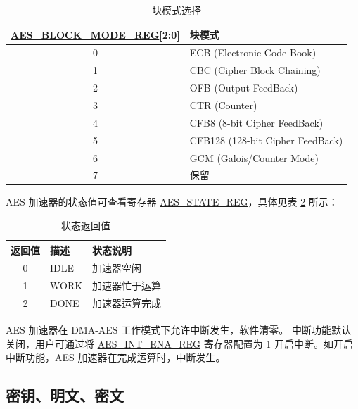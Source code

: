 \documentclass[main\_\_CN.tex]{subfiles}
\begin{document}
\begin{longtable}[c]{ | c | l | }
\caption{块模式选择}
\label{tab:aes-block-mode}
\\\hline
\rowcolor{lightgray}
\textbf{\hyperref[regdesc:AESBLOCKMODEREG]{AES\_BLOCK\_MODE\_REG}[2:0]}     & \textbf{块模式}\\
    \hline
    0                          & ECB (Electronic Code Book)    \\
    \hline
    1                          & CBC (Cipher Block Chaining)     \\
    \hline
    2                          & OFB (Output FeedBack)    \\
    \hline
    3                          & CTR (Counter)    \\
    \hline
    4                          & CFB8 (8-bit Cipher FeedBack)    \\
    \hline
    5                          & CFB128 (128-bit Cipher FeedBack) \\
    \hline
    6                          & GCM (Galois/Counter Mode)     \\
    \hline
    7                          & 保留     \\
    \hline
\end{longtable}

\clearpage
AES 加速器的状态值可查看寄存器 \hyperref[regdesc:AESSTATEREG]{AES\_STATE\_REG}，具体见表 \ref{tab:aes-state-value-dma} 所示：

\begin{longtable}[c]{ | c | l | l | }
\caption{状态返回值}
\label{tab:aes-state-value-dma}
\\\hline
\rowcolor{lightgray}
\textbf{返回值} & \textbf{描述} &  \textbf{状态说明} \\ \hline

    0                   & IDLE      &   加速器空闲\\ \hline
    1                   & WORK      &   加速器忙于运算     \\ \hline
    2                   & DONE      &   加速器运算完成     \\ \hline
\end{longtable}

AES 加速器在 DMA-AES 工作模式下允许中断发生，软件清零。
中断功能默认关闭，用户可通过将 \hyperref[regdesc:AESINTENAREG]{AES\_INT\_ENA\_REG} 寄存器配置为 1 开启中断。如开启中断功能，AES 加速器在完成运算时，中断发生。

\subsection{密钥、明文、密文}
\end{document}
